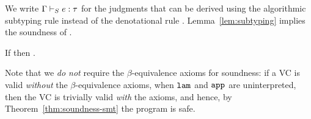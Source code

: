 %
We write $\Gamma \vdash_{S} e : \tau$ for the judgments that
can be derived using the algorithmic subtyping rule
\rsubbasesmt instead of the denotational rule \rsubbasecore.
%
Lemma~\ref{lem:subtyping} implies the soundness of \smtlan.
%
\begin{theorem}\label{thm:soundness-smt}
If  then .
\end{theorem}
%
Note that we \emph{do not} require the $\beta$-equivalence axioms
for soundness: if a VC is valid \emph{without} the $\beta$-equivalence
axioms, \ie when $\texttt{lam}^{}_{}$ and $\texttt{app}^{}_{}$ are
uninterpreted, then the VC is trivially valid \emph{with}
the axioms, and hence, by Theorem~\ref{thm:soundness-smt}
the program is safe.

